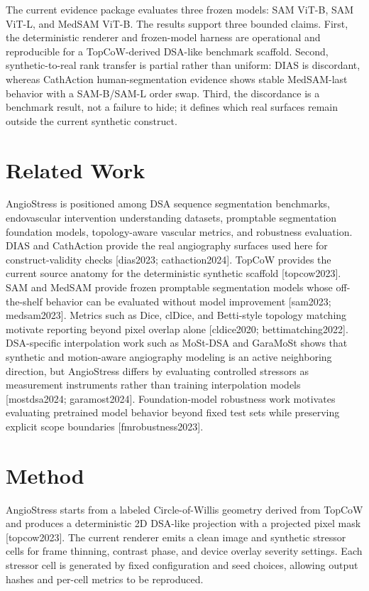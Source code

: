 \documentclass[11pt]{article}
\begin{document}
The current evidence package evaluates three frozen models: SAM ViT-B, SAM ViT-L, and MedSAM ViT-B. The results support three bounded claims. First, the deterministic renderer and frozen-model harness are operational and reproducible for a TopCoW-derived DSA-like benchmark scaffold. Second, synthetic-to-real rank transfer is partial rather than uniform: DIAS is discordant, whereas CathAction human-segmentation evidence shows stable MedSAM-last behavior with a SAM-B/SAM-L order swap. Third, the discordance is a benchmark result, not a failure to hide; it defines which real surfaces remain outside the current synthetic construct.


\section*{Related Work}

AngioStress is positioned among DSA sequence segmentation benchmarks, endovascular intervention understanding datasets, promptable segmentation foundation models, topology-aware vascular metrics, and robustness evaluation. DIAS and CathAction provide the real angiography surfaces used here for construct-validity checks \textup{[dias2023; cathaction2024]}. TopCoW provides the current source anatomy for the deterministic synthetic scaffold \textup{[topcow2023]}. SAM and MedSAM provide frozen promptable segmentation models whose off-the-shelf behavior can be evaluated without model improvement \textup{[sam2023; medsam2023]}. Metrics such as Dice, clDice, and Betti-style topology matching motivate reporting beyond pixel overlap alone \textup{[cldice2020; bettimatching2022]}. DSA-specific interpolation work such as MoSt-DSA and GaraMoSt shows that synthetic and motion-aware angiography modeling is an active neighboring direction, but AngioStress differs by evaluating controlled stressors as measurement instruments rather than training interpolation models \textup{[mostdsa2024; garamost2024]}. Foundation-model robustness work motivates evaluating pretrained model behavior beyond fixed test sets while preserving explicit scope boundaries \textup{[fmrobustness2023]}.


\section*{Method}

AngioStress starts from a labeled Circle-of-Willis geometry derived from TopCoW and produces a deterministic 2D DSA-like projection with a projected pixel mask \textup{[topcow2023]}. The current renderer emits a clean image and synthetic stressor cells for frame thinning, contrast phase, and device overlay severity settings. Each stressor cell is generated by fixed configuration and seed choices, allowing output hashes and per-cell metrics to be reproduced.
\end{document}
